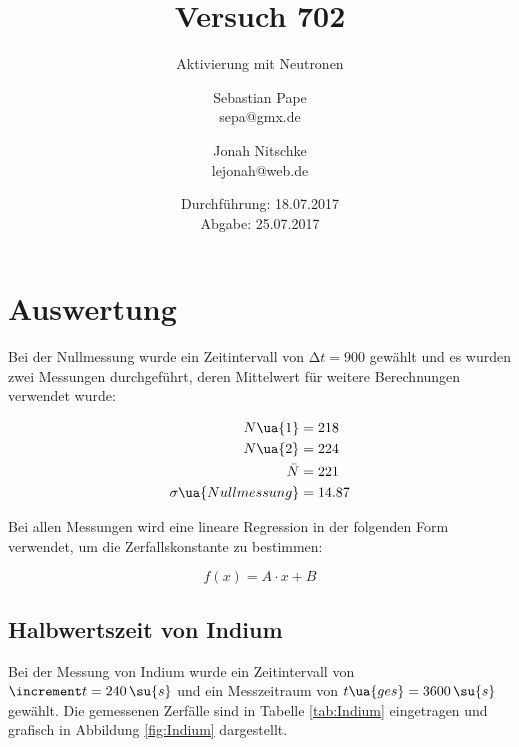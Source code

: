 

\title{Versuch 702}
\subtitle{Aktivierung mit Neutronen}
\author{Sebastian Pape\\
        sepa@gmx.de \and
        Jonah Nitschke\\
        lejonah@web.de}
\date{Durchführung: 18.07.2017\\
      Abgabe: 25.07.2017}



\maketitle

\section{Auswertung}

Bei der Nullmessung wurde ein Zeitintervall von $\increment t = 900$ gewählt und
es wurden zwei Messungen durchgeführt, deren Mittelwert für weitere Berechnungen
verwendet wurde:

\begin{align*}
  N\ua{1}                &= 218 \\
  N\ua{2}                &= 224 \\
  \bar{N}                &= 221 \\
  \sigma\ua{Nullmessung} &= 14.87
\end{align*}

Bei allen Messungen wird eine lineare Regression in der folgenden Form verwendet,
um die Zerfallskonstante zu bestimmen:

\begin{equation}
  f(x) = A \cdot x + B
  \label{eqn:linRegress}
\end{equation}

\subsection{Halbwertszeit von Indium}

Bei der Messung von Indium wurde ein Zeitintervall von $\increment t = 240 \,
\su{s}$ und ein Messzeitraum von $t\ua{ges} = 3600 \, \su{s}$ gewählt. Die
gemessenen Zerfälle sind in Tabelle \ref{tab:Indium} eingetragen und grafisch
in Abbildung \ref{fig:Indium} dargestellt.

